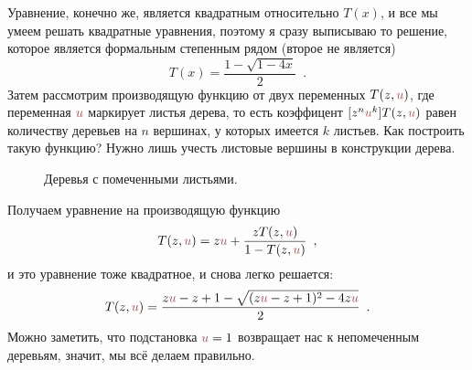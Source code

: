 \documentclass[a5paper]{article}
\theoremstyle{definition}
\begin{document}
Уравнение, конечно же, является квадратным относительно \( T(x) \), и все мы умеем решать квадратные
уравнения, поэтому я сразу выписываю то решение, которое является формальным
степенным рядом (второе не является)
\begin{equation}
    T(x) = \dfrac{1 - \sqrt{1 - 4x}}{2} \enspace .
\end{equation}
\def\uu{ {\color{blackred}u} }
Затем рассмотрим производящую функцию от двух переменных \( T(z, \uu) \), 
где переменная \( \uu \) маркирует листья дерева, то есть коэффицент
\( [z^n \uu^k] T(z, \uu) \) равен количеству деревьев на \( n \) вершинах, у
которых имеется \( k \) листьев. Как построить такую функцию? Нужно лишь учесть
листовые вершины в конструкции дерева.

\begin{figure}[hbt]
\centering
{}
\caption{\label{fig:tree:marked}
Деревья с помеченными листьями.}
\end{figure}
Получаем уравнение на производящую функцию
\begin{equation}
    T(z, \uu) = z \uu + \dfrac{z T(z, \uu)}{1 - T(z, \uu)}
    \enspace ,
\end{equation}
и это уравнение тоже квадратное, и снова легко решается:
\begin{equation}
    T(z, \uu) = \dfrac{z\uu - z + 1 - \sqrt{(z\uu-z+1)^2-4z\uu}}{2}
    \enspace .
\end{equation}
Можно заметить, что подстановка \( \uu = 1 \) возвращает нас к непомеченным
деревьям, значит, мы всё делаем правильно.
\end{document}
